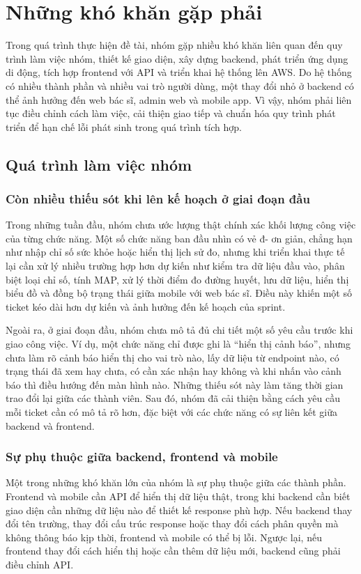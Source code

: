 \section{Những khó khăn gặp phải}
\par Trong quá trình thực hiện đề tài, nhóm gặp nhiều khó khăn liên quan đến quy trình làm việc nhóm, thiết kế giao diện, xây dựng backend, phát triển ứng dụng di động, tích hợp frontend với API và triển khai hệ thống lên AWS. Do hệ thống có nhiều thành phần và nhiều vai trò người dùng, một thay đổi nhỏ ở backend có thể ảnh hưởng đến web bác sĩ, admin web và mobile app. Vì vậy, nhóm phải liên tục điều chỉnh cách làm việc, cải thiện giao tiếp và chuẩn hóa quy trình phát triển để hạn chế lỗi phát sinh trong quá trình tích hợp.

\subsection{Quá trình làm việc nhóm}

\subsubsection{Còn nhiều thiếu sót khi lên kế hoạch ở giai đoạn đầu}
\par Trong những tuần đầu, nhóm chưa ước lượng thật chính xác khối lượng công việc của từng chức năng. Một số chức năng ban đầu nhìn có vẻ đ- ơn giản, chẳng hạn như nhập chỉ số sức khỏe hoặc hiển thị lịch sử đo, nhưng khi triển khai thực tế lại cần xử lý nhiều trường hợp hơn dự kiến như kiểm tra dữ liệu đầu vào, phân biệt loại chỉ số, tính MAP, xử lý thời điểm đo đường huyết, lưu dữ liệu, hiển thị biểu đồ và đồng bộ trạng thái giữa mobile với web bác sĩ. Điều này khiến một số ticket kéo dài hơn dự kiến và ảnh hưởng đến kế hoạch của sprint.

\par Ngoài ra, ở giai đoạn đầu, nhóm chưa mô tả đủ chi tiết một số yêu cầu trước khi giao công việc. Ví dụ, một chức năng chỉ được ghi là ``hiển thị cảnh báo'', nhưng chưa làm rõ cảnh báo hiển thị cho vai trò nào, lấy dữ liệu từ endpoint nào, có trạng thái đã xem hay chưa, có cần xác nhận hay không và khi nhấn vào cảnh báo thì điều hướng đến màn hình nào. Những thiếu sót này làm tăng thời gian trao đổi lại giữa các thành viên. Sau đó, nhóm đã cải thiện bằng cách yêu cầu mỗi ticket cần có mô tả rõ hơn, đặc biệt với các chức năng có sự liên kết giữa backend và frontend.

\subsubsection{Sự phụ thuộc giữa backend, frontend và mobile}
\par Một trong những khó khăn lớn của nhóm là sự phụ thuộc giữa các thành phần. Frontend và mobile cần API để hiển thị dữ liệu thật, trong khi backend cần biết giao diện cần những dữ liệu nào để thiết kế response phù hợp. Nếu backend thay đổi tên trường, thay đổi cấu trúc response hoặc thay đổi cách phân quyền mà không thông báo kịp thời, frontend và mobile có thể bị lỗi. Ngược lại, nếu frontend thay đổi cách hiển thị hoặc cần thêm dữ liệu mới, backend cũng phải điều chỉnh API.

